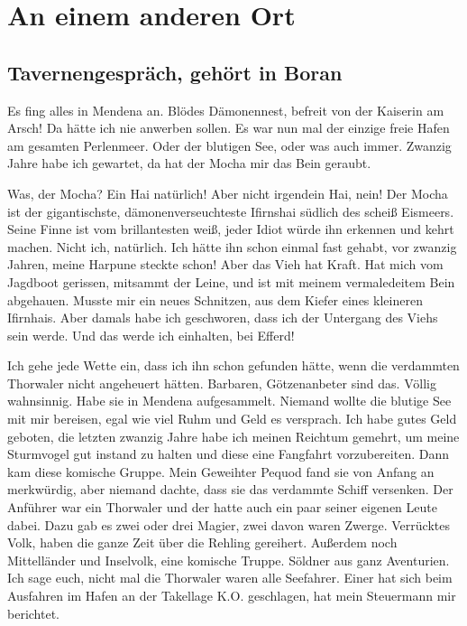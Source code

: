 \documentclass[final]{multiversum}
\begin{document}
\section{An einem anderen Ort}

\subsection{Tavernengespräch, gehört in Boran}
Es fing alles in Mendena an.
Blödes Dämonennest, befreit von der Kaiserin am Arsch!
Da hätte ich nie anwerben sollen.
Es war nun mal der einzige freie Hafen am gesamten Perlenmeer.
Oder der blutigen See, oder was auch immer.
Zwanzig Jahre habe ich gewartet, da hat der Mocha mir das Bein geraubt.

Was, der Mocha?
Ein Hai natürlich!
Aber nicht irgendein Hai, nein!
Der Mocha ist der gigantischste, dämonenverseuchteste Ifirnshai südlich des scheiß Eismeers.
Seine Finne ist vom brillantesten weiß, jeder Idiot würde ihn erkennen und kehrt machen.
Nicht ich, natürlich.
Ich hätte ihn schon einmal fast gehabt, vor zwanzig Jahren, meine Harpune steckte schon!
Aber das Vieh hat Kraft. 
Hat mich vom Jagdboot gerissen, mitsammt der Leine, und ist mit meinem vermaledeitem Bein abgehauen.
Musste mir ein neues Schnitzen, aus dem Kiefer eines kleineren Ifirnhais.
Aber damals habe ich geschworen, dass ich der Untergang des Viehs sein werde.
Und das werde ich einhalten, bei Efferd!

Ich gehe jede Wette ein, dass ich ihn schon gefunden hätte, wenn die verdammten Thorwaler nicht angeheuert hätten.
Barbaren, Götzenanbeter sind das.
Völlig wahnsinnig.
Habe sie in Mendena aufgesammelt.
Niemand wollte die blutige See mit mir bereisen, egal wie viel Ruhm und Geld es versprach.
Ich habe gutes Geld geboten, die letzten zwanzig Jahre habe ich meinen Reichtum gemehrt, um meine Sturmvogel gut instand zu halten und diese eine Fangfahrt vorzubereiten.
Dann kam diese komische Gruppe.
Mein Geweihter Pequod fand sie von Anfang an merkwürdig, aber niemand dachte, dass sie das verdammte Schiff versenken.
Der Anführer war ein Thorwaler und der hatte auch ein paar seiner eigenen Leute dabei.
Dazu gab es zwei oder drei Magier, zwei davon waren Zwerge.
Verrücktes Volk, haben die ganze Zeit über die Rehling gereihert.
Außerdem noch Mittelländer und Inselvolk, eine komische Truppe.
Söldner aus ganz Aventurien.
Ich sage euch, nicht mal die Thorwaler waren alle Seefahrer.
Einer hat sich beim Ausfahren im Hafen an der Takellage K.O. geschlagen, hat mein Steuermann mir berichtet.
\end{document}
